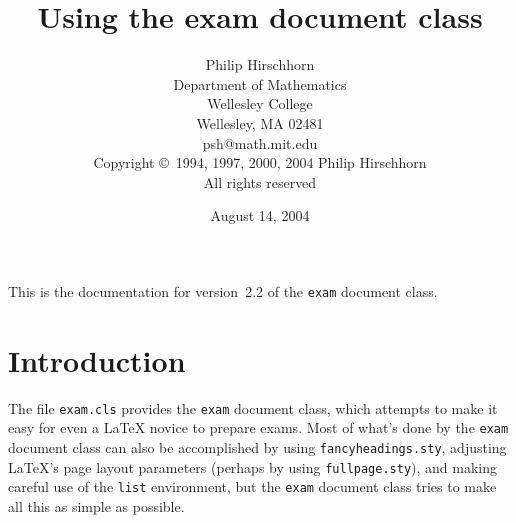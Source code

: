 \documentclass[12pt]{exam}
\newcommand{\docversion}{2.2}
\newcommand{\docdate}{August 14, 2004}
\begin{document}
\title{Using the exam document class}

\author{Philip Hirschhorn\\
Department of Mathematics\\
Wellesley College\\
Wellesley, MA 02481\\
psh@math.mit.edu\\[\bigskipamount]
Copyright \copyright~1994, 1997, 2000, 2004 Philip Hirschhorn\\
   All rights reserved}

\date{\docdate}

\maketitle

\begin{center}
  \small
  This is the documentation for version~\docversion{} of the
  \verb"exam" document class. 
\end{center}

\tableofcontents

\section{Introduction}

The file \verb"exam.cls" provides the \verb"exam" document class,
which attempts to make it easy for even a \LaTeX{} novice to prepare
exams.  Most of what's done by the \verb"exam" document class can also
be accomplished by using \verb"fancyheadings.sty", adjusting \LaTeX's
page layout parameters (perhaps by using \verb"fullpage.sty"), and
making careful use of the \verb"list" environment, but the \verb"exam"
document class tries to make all this as simple as possible.
\end{document}
